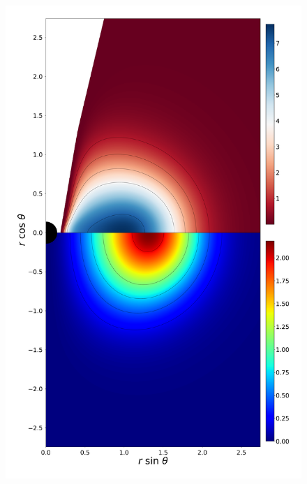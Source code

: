 \documentclass[twocolumn,aps,showpacs,showkeys,prd,superscriptaddress,byrevtex, amsmath]{revtex4-1}
\begin{document}
\begin{figure}
\includegraphics[scale=0.12]{figures/fig6_VII_10.pdf}
\hspace{-0.2cm}
\\

\end{figure}
\end{document}
